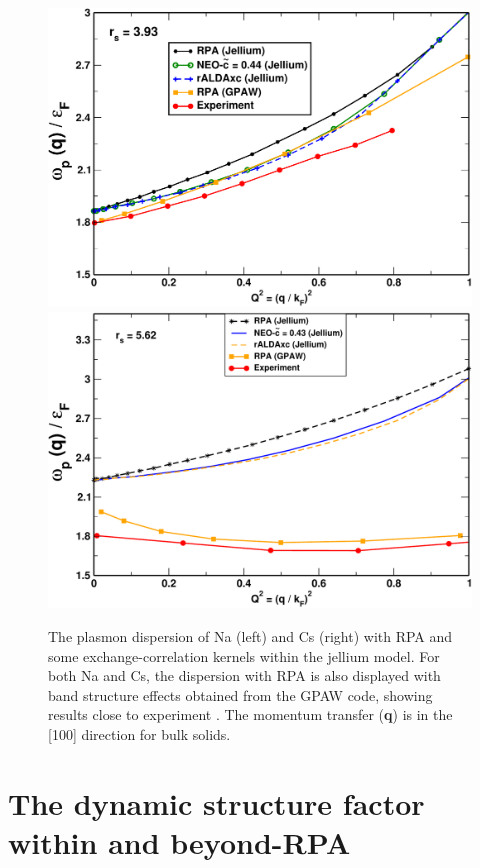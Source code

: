 \documentclass[aps,amsmath,amssymb, preprint, 12pt]{revtex4-1}
\begin{document}
\begin{figure}[h!]
\centering
		\includegraphics[scale=0.32]{figure_6a.pdf}
		\includegraphics[scale=0.32]{figure_6b.pdf}
\caption{The plasmon dispersion of Na (left) and Cs (right) with RPA and some exchange-correlation kernels within the jellium model. For both Na and Cs, the dispersion with RPA is also displayed with band structure effects obtained from the GPAW code, showing results close to experiment \cite{VSF89}. The momentum transfer (\textbf{q}) is in the [100] direction for bulk solids.}
\label{real}
\end{figure}




\section{The dynamic structure factor within and beyond-RPA}
\end{document}
